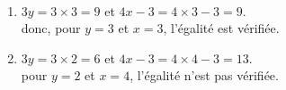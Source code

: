    \ \\ [-5mm]
   \begin{enumerate}
      \item $3y =3\times3 =9$ et $4x-3 =4\times3-3 =9$. \\
      donc, pour $y =3$ et $x =3$, {\blue l'égalité est vérifiée}.
      \item $3y =3\times2 =6$ et $4x-3 =4\times4-3 =13$. \\
      pour $y =2$ et $x =4$, {\blue l'égalité n'est pas vérifiée}.
   \end{enumerate}
